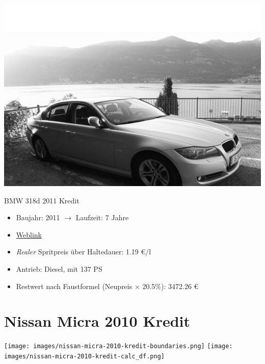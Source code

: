 \documentclass[landscape, DIV=99, 14pt]{scrartcl}
\begin{document}
\pagebreak
\null
\vspace{2cm}
\begin{center}
\includegraphics[width=0.9\columnwidth]{cars/bmw-3er-maximus.png}

BMW 318d 2011 Kredit
\end{center}

\begin{itemize}
    \item Baujahr: 2011 $\rightarrow$ Laufzeit: 7 Jahre
    \item \href{https://de.wikipedia.org/wiki/BMW_E90}{Weblink}
    \item \emph{Realer} Spritpreis \"uber Haltedauer: 1.19 \euro{}/l
    \item Antrieb: Diesel, mit 137 PS
    \item Restwert nach Faustformel (Neupreis $\times$ 20.5\%): 3472.26 \euro{}
\end{itemize}

\pagebreak


\twocolumn

\section*{Nissan Micra 2010 Kredit}
\begin{center}
\texttt{[image: images/nissan-micra-2010-kredit-boundaries.png]}
\null
\vspace{0.5cm}
\texttt{[image: images/nissan-micra-2010-kredit-calc\_df.png]}
\end{center}
\end{document}
